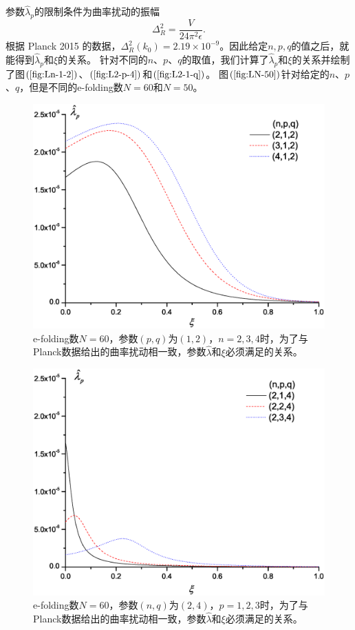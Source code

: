 参数$\hat{\lambda}_{p}$的限制条件为曲率扰动的振幅
\begin{equation}
  \label{eq:amplitude-of-curvature-perturbation-by-Planck}
  \Delta^2_{R} = \frac{V}{24\pi^2\epsilon}.
\end{equation}
根据 Planck 2015 的数据，$\Delta^2_{R}(k_0)=2.19\times
10^{-9}$。因此给定$n,p,q$的值之后，就能得到$\hat{\lambda}_{p}$和$\xi$的关系。
针对不同的$n$、$p$、$q$的取值，我们计算了$\hat{\lambda}_{p}$和$\xi$的关系并绘制了图$(\ref{fig:Ln-1-2})$、$(\ref{fig:L2-p-4})$和$(\ref{fig:L2-1-q})$。
图$(\ref{fig:LN-50})$针对给定的$n$、$p$、$q$，但是不同的e-folding数$N=60$和$N=50$。

\begin{figure}
  \centering
  \includegraphics[width=5in]{Img/Ln,1,2.eps}
  \caption{e-folding数$N=60$，参数$(p,q)$为$(1,
  2)$，$n=2,3,4$时，为了与Planck数据给出的曲率扰动相一致，参数$\hat{\lambda}$和$\xi$必须满足的关系。}\label{fig:Ln-1-2}
\end{figure}

\begin{figure}\small
  \centering
  \includegraphics[width=5in]{Img/L2,p,4.eps}
  \caption{e-folding数$N=60$，参数$(n,q)$为$(2,
  4)$，$p=1,2,3$时，为了与Planck数据给出的曲率扰动相一致，参数$\hat{\lambda}$和$\xi$必须满足的关系。}\label{fig:L2-p-4}
\end{figure}

